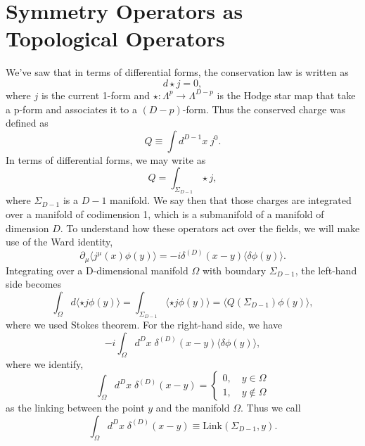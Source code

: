 \documentclass{article}
\begin{document}
\section{Symmetry Operators as Topological Operators}
We’ve saw that in terms of differential forms, the conservation law is written as
\begin{equation}
	d\star j=0,
\end{equation}
where $j$ is the current 1-form and $\star:\Lambda^p\to \Lambda^{D-p}$   is the Hodge star map that take a p-form and associates it to a $(D-p)$-form. Thus the conserved charge was defined as
\begin{equation}
	Q\equiv\int d^{D-1}x\;j^0.
\end{equation}
In terms of differential forms, we may write as
\begin{equation}
	Q=\int_{\Sigma_{D-1}}\star j,
\end{equation}
where $\Sigma_{D-1}$  is a $D-1$  manifold. We say then that those charges are integrated over a manifold of codimension 1, which is a submanifold of a manifold of dimension $D$.  To understand how these operators act over the fields, we will make use of the Ward identity,
\begin{equation}
	\partial_\mu\langle j^\mu(x)\phi(y)\rangle=-i\delta^{(D)}(x-y)\langle\delta\phi(y)\rangle.
\end{equation}
Integrating over a D-dimensional manifold $\Omega$  with boundary $\Sigma_{D-1}$, the left-hand side becomes
\begin{equation}
	\int_{\Omega}d\langle\star j\phi(y)\rangle=\int_{\Sigma_{D-1}}\langle\star j\phi(y)\rangle=\langle Q(\Sigma_{D-1})\phi(y)\rangle,
\end{equation}
where we used Stokes theorem. For the right-hand side, we have
\begin{equation}
	-i\int_{\Omega}d^Dx\;\delta^{(D)}(x-y)\langle\delta\phi(y)\rangle,
\end{equation}
where we identify,
\begin{equation}
	\int_{\Omega}d^Dx\;\delta^{(D)}(x-y)=\begin{cases}0,\quad y\in\Omega\\1,\quad y\not\in\Omega\end{cases}
\end{equation}
as the linking between the point $y$ and the manifold $\Omega$. Thus we call  
\begin{equation}
	\int_{\Omega}d^Dx\;\delta^{(D)}(x-y)\equiv \text{Link}(\Sigma_{D-1},y).
\end{equation}
\end{document}
